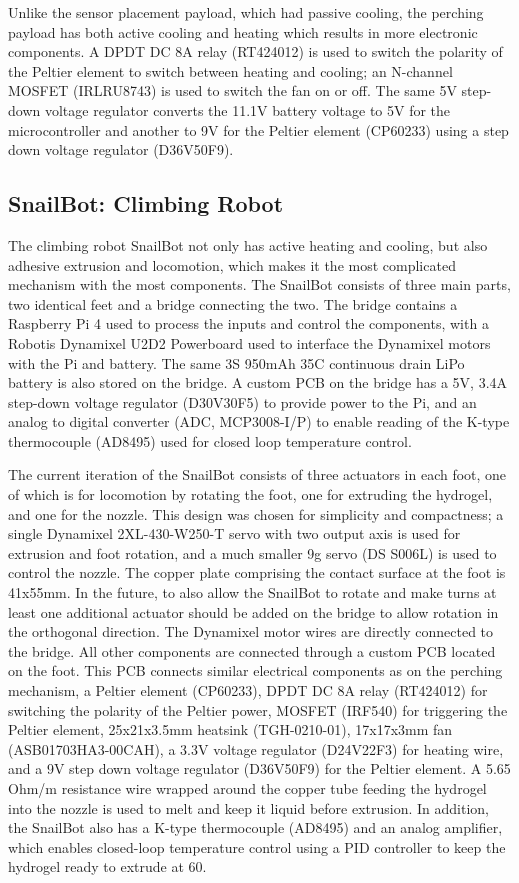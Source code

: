 Unlike the sensor placement payload, which had passive cooling, the perching payload has both active cooling and heating which results in more electronic components. A DPDT DC 8A relay (RT424012) is used to switch the polarity of the Peltier element to switch between heating and cooling; an N-channel MOSFET (IRLRU8743) is used to switch the fan on or off. The same 5V step-down voltage regulator converts the 11.1V battery voltage to 5V for the microcontroller and another to 9V for the Peltier element (CP60233) using a step down voltage regulator (D36V50F9).

\subsection{SnailBot: Climbing Robot}
\label{subsec:experimental_snailbot}
The climbing robot SnailBot not only has active heating and cooling, but also adhesive extrusion and locomotion, which makes it the most complicated mechanism with the most components. The SnailBot consists of three main parts, two identical feet and a bridge connecting the two. The bridge contains a Raspberry Pi 4 used to process the inputs and control the components, with a Robotis Dynamixel U2D2 Powerboard used to interface the Dynamixel motors with the Pi and battery. The same 3S 950mAh 35C continuous drain LiPo battery is also stored on the bridge. A custom PCB on the bridge has a 5V, 3.4A step-down voltage regulator (D30V30F5) to provide power to the Pi, and an analog to digital converter (ADC, MCP3008-I/P) to enable reading of the K-type thermocouple (AD8495) used for closed loop temperature control.

The current iteration of the SnailBot consists of three actuators in each foot, one of which is for locomotion by rotating the foot, one for extruding the hydrogel, and one for the nozzle. This design was chosen for simplicity and compactness; a single Dynamixel 2XL-430-W250-T servo with two output axis is used for extrusion and foot rotation, and a much smaller 9g servo (DS S006L) is used to control the nozzle. The copper plate comprising the contact surface at the foot is 41x55mm.
In the future, to also allow the SnailBot to rotate and make turns at least one additional actuator should be added on the bridge to allow rotation in the orthogonal direction. The Dynamixel motor wires are directly connected to the bridge. All other components are connected through a custom PCB located on the foot. This PCB connects  similar electrical components as on the perching mechanism, a Peltier element (CP60233), DPDT DC 8A relay (RT424012) for switching the polarity of the Peltier power, MOSFET (IRF540) for triggering the Peltier element, 25x21x3.5mm heatsink (TGH-0210-01), 17x17x3mm fan (ASB01703HA3-00CAH), a 3.3V voltage regulator (D24V22F3) for heating wire, and a 9V step down voltage regulator (D36V50F9) for the Peltier element.  A 5.65 Ohm/m resistance wire wrapped around the copper tube feeding the hydrogel into the nozzle is used to melt and keep it liquid before extrusion. In addition, the SnailBot also has a K-type thermocouple (AD8495) and an analog amplifier,  which enables closed-loop temperature control using a PID controller to keep the hydrogel ready to extrude at 60\degree.


